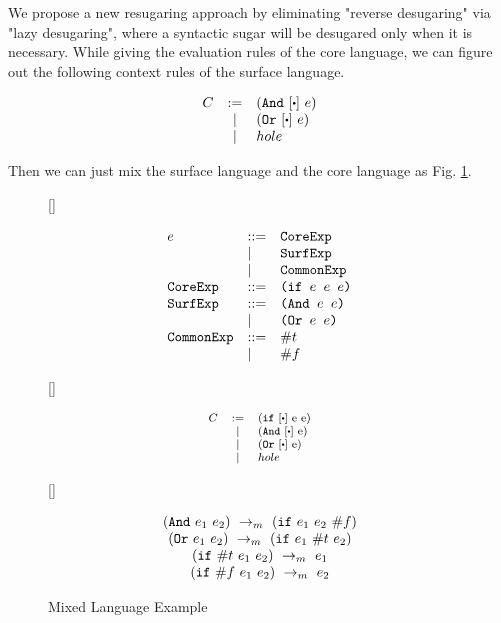 We propose a new resugaring approach by eliminating "reverse desugaring" via "lazy desugaring", where a syntactic sugar will be desugared only when it is necessary. While giving the evaluation rules of the core language, we can figure out the following context rules of the surface language.

\[
\begin{array}{lcl}
C &:=& (\m{And}~[\bigcdot]~e)\\
&|& (\m{Or}~[\bigcdot]~e)\\
&|&hole\\
\end{array}
\]

Then we can just mix the surface language and the core language as Fig. \ref{fig:mixexample}.

\begin{figure}[thb]
\centering
{}[\linewidth]{\footnotesize
\begin{flushleft}
\[
\begin{array}{lll}
e &::=& \mbox{\tt CoreExp} \\
&|&\mbox{\tt SurfExp}\\
&|&\mbox{\tt CommonExp}\\
\mbox{\tt CoreExp} &::=& \texttt{(if~$e$~$e$~$e$)}\\
\mbox{\tt SurfExp} &::=& \texttt{(And~$e$~$e$)}\\
&|&\texttt{(Or~$e$~$e$)}\\
\mbox{\tt CommonExp} &::=& \#t\\
&|& \#f\\
\end{array}
\]
\end{flushleft}

}
[\linewidth]{
\begin{flushleft}
\[\footnotesize
\begin{array}{lcl}
C &:=& (\m{if}~[\bigcdot]~$e$~$e$)\\
&|& (\m{And}~[\bigcdot]~$e$)\\
&|& (\m{Or}~[\bigcdot]~$e$)\\
&|&hole\\
\end{array}
\]
\end{flushleft}

}

[\linewidth]{\footnotesize
\begin{flushleft}
\[
\begin{array}{c}
(\mbox{\tt And}~e_1~e_2) ~\rightarrow_m~(\mbox{\tt if}~e_1~e_2~\#f)\\
(\mbox{\tt Or}~e_1~e_2) ~\rightarrow_m~(\mbox{\tt if}~e_1~\#t~e_2)\\
(\mbox{\tt if}~\#t~e_1~e_2) ~\rightarrow_m~e_1\\
(\mbox{\tt if}~\#f~e_1~e_2) ~\rightarrow_m~e_2 
\end{array}
\]
\end{flushleft}

}

\caption{Mixed Language Example}
\label{fig:mixexample}
\end{figure}

